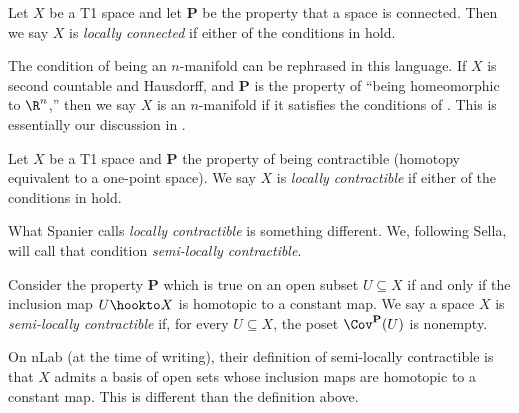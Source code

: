 \documentclass[11pt]{book}
\begin{document}
\begin{definition}\label{def:locally-connected} Let $X$ be a T1 space and let \textbf{P} be the property that a space is connected. Then we say $X$ is \emph{locally connected} if either of the conditions in  hold.
\end{definition}

\begin{remark} The condition of being an $n$-manifold can be rephrased in this language. If $X$ is second countable and Hausdorff, and \textbf{P} is the property of ``being homeomorphic to $\R^n$,'' then we say $X$ is an $n$-manifold if it satisfies the conditions of . This is essentially our discussion in .
\end{remark}

\begin{definition}\label{def:locally-contractible} Let $X$ be a T1 space and \textbf{P} the property of being contractible (homotopy equivalent to a one-point space). We say $X$ is \emph{locally contractible} if either of the conditions in  hold.
\end{definition}

What Spanier calls \emph{locally contractible} is something different. We, following Sella, will call that condition \emph{semi-locally contractible}.

\begin{definition}\label{def:semi-locally-contractible} Consider the property \textbf{P} which is true on an open subset $U \subseteq X$ if and only if the inclusion map $U \hookto X$ is homotopic to a constant map. We say a space $X$ is \emph{semi-locally contractible} if, for every $U \subseteq X$, the poset $\Cov^{\mathbf{P}}(U)$ is nonempty.
\end{definition}

\begin{remark} On nLab (at the time of writing), their definition of semi-locally contractible is that $X$ admits a basis of open sets whose inclusion maps are homotopic to a constant map. This is different than the definition above.
\end{remark}
\end{document}
